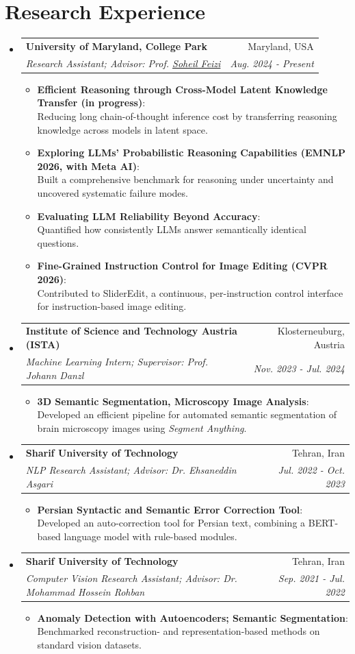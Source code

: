 \documentclass[letterpaper,10pt]{article}
\makeatletter
\newcommand{\cvHeading}[4]{%
  \item
  \begin{tabular*}{\linewidth}{@{}l@{\extracolsep{\fill}}r@{}}
    \textbf{#1} & #2 \\[1pt]
    \textit{\small #3} & \textit{\small #4}
  \end{tabular*}%
}
\newcommand{\feizi}{\href{https://scholar.google.com/citations?user=lptAmrMAAAAJ\&hl=en}{Soheil Feizi}}
\newcommand{\cvDetail}[2]{\item \textbf{#1}:\\ #2}
\newenvironment{cvlist}
  {\begin{itemize}[leftmargin=0.16in,label=\textbullet,itemsep=5pt,parsep=0pt,topsep=4pt,partopsep=0pt]}
  {\end{itemize}}
\newenvironment{cvsublist}
  {\begin{itemize}[leftmargin=0.2in,label=$\circ$,itemsep=2pt,parsep=0pt,topsep=4pt,partopsep=0pt]\small}
  {\end{itemize}}
\makeatother
\begin{document}
\section{Research Experience}
\begin{cvlist}
  \cvHeading
    {University of Maryland, College Park}{Maryland, USA}
    {Research Assistant; Advisor: Prof. \feizi}{Aug. 2024 - Present}
  \begin{cvsublist}
    \cvDetail{Efficient Reasoning through Cross-Model Latent Knowledge Transfer (in progress)}
      {Reducing long chain-of-thought inference cost by transferring reasoning knowledge across models in latent space.}
    \cvDetail{Exploring LLMs' Probabilistic Reasoning Capabilities (EMNLP 2026, with Meta AI)}
      {Built a comprehensive benchmark for reasoning under uncertainty and uncovered systematic failure modes.}
    \cvDetail{Evaluating LLM Reliability Beyond Accuracy}
      {Quantified how consistently LLMs answer semantically identical questions.}
    \cvDetail{Fine-Grained Instruction Control for Image Editing (CVPR 2026)}
      {Contributed to SliderEdit, a continuous, per-instruction control interface for instruction-based image editing.}
  \end{cvsublist}

  \cvHeading
    {Institute of Science and Technology Austria (ISTA)}{Klosterneuburg, Austria}
    {Machine Learning Intern; Supervisor: Prof. Johann Danzl}{Nov. 2023 - Jul. 2024}
  \begin{cvsublist}
    \cvDetail{3D Semantic Segmentation, Microscopy Image Analysis}
      {Developed an efficient pipeline for automated semantic segmentation of brain microscopy images using \textit{Segment Anything}.}
  \end{cvsublist}

  \cvHeading
    {Sharif University of Technology}{Tehran, Iran}
    {NLP Research Assistant; Advisor: Dr. Ehsaneddin Asgari}{Jul. 2022 - Oct. 2023}
  \begin{cvsublist}
    \cvDetail{Persian Syntactic and Semantic Error Correction Tool}
      {Developed an auto-correction tool for Persian text, combining a BERT-based language model with rule-based modules.}
  \end{cvsublist}

  \cvHeading
    {Sharif University of Technology}{Tehran, Iran}
    {Computer Vision Research Assistant; Advisor: Dr. Mohammad Hossein Rohban}{Sep. 2021 - Jul. 2022}
  \begin{cvsublist}
    \cvDetail{Anomaly Detection with Autoencoders; Semantic Segmentation}
      {Benchmarked reconstruction- and representation-based methods on standard vision datasets.}
  \end{cvsublist}
\end{cvlist}
\end{document}
